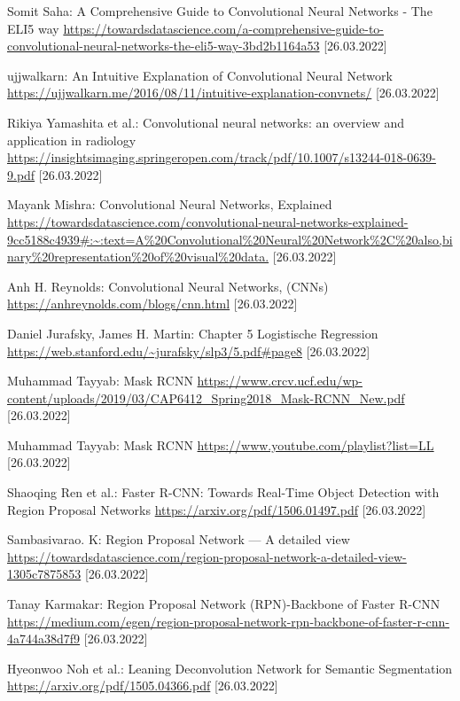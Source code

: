 \documentclass[10pt]{report}
\begin{document}
\begin{thebibliography}{}


 Somit Saha: A Comprehensive Guide to Convolutional Neural Networks - The ELI5 way
 \url{https://towardsdatascience.com/a-comprehensive-guide-to-convolutional-neural-networks-the-eli5-way-3bd2b1164a53} [26.03.2022]

 ujjwalkarn: An Intuitive Explanation of Convolutional Neural Network
 \url{https://ujjwalkarn.me/2016/08/11/intuitive-explanation-convnets/} [26.03.2022]

 Rikiya Yamashita et al.: Convolutional neural networks: an overview and application in radiology
 \url{https://insightsimaging.springeropen.com/track/pdf/10.1007/s13244-018-0639-9.pdf} [26.03.2022]

 Mayank Mishra: Convolutional Neural Networks, Explained 
 \url{https://towardsdatascience.com/convolutional-neural-networks-explained-9cc5188c4939#:~:text=A%20Convolutional%20Neural%20Network%2C%20also,binary%20representation%20of%20visual%20data.} [26.03.2022]

 Anh H. Reynolds: Convolutional Neural Networks, (CNNs)
 \url{https://anhreynolds.com/blogs/cnn.html} [26.03.2022]
 
 Daniel Jurafsky, James H. Martin: Chapter 5 Logistische Regression
 \url{https://web.stanford.edu/~jurafsky/slp3/5.pdf#page8} [26.03.2022]


 Muhammad Tayyab: Mask RCNN \url{https://www.crcv.ucf.edu/wp-content/uploads/2019/03/CAP6412_Spring2018_Mask-RCNN_New.pdf} [26.03.2022]

 Muhammad Tayyab: Mask RCNN \url{https://www.youtube.com/playlist?list=LL} [26.03.2022]


 Shaoqing Ren et al.: Faster R-CNN: Towards Real-Time Object Detection with Region Proposal Networks
 \url{https://arxiv.org/pdf/1506.01497.pdf} [26.03.2022]

 Sambasivarao. K: Region Proposal Network — A detailed view \url{https://towardsdatascience.com/region-proposal-network-a-detailed-view-1305c7875853} [26.03.2022]

 Tanay Karmakar: Region Proposal Network (RPN)-Backbone of Faster R-CNN \url{https://medium.com/egen/region-proposal-network-rpn-backbone-of-faster-r-cnn-4a744a38d7f9} [26.03.2022]

 Hyeonwoo Noh et al.: Leaning Deconvolution Network for Semantic Segmentation \url{https://arxiv.org/pdf/1505.04366.pdf} [26.03.2022]


\end{thebibliography}
\end{document}

